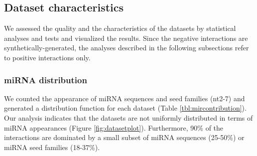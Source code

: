 \documentclass{bmcart}
\begin{document}
\begin{table}[h!]
\caption{Summary of data processing pipeline}
      \label{tal:pipeline_summary}
\end{table}

\subsection*{Dataset characteristics}
We assessed the quality and the characteristics of the datasets by statistical analyses and tests and visualized the results. Since the negative interactions are synthetically-generated, the analyses described in the following subsections refer to positive interactions only.

\subsubsection*{miRNA distribution}
We counted the appearance of miRNA sequences and seed families (nt2-7) and generated a distribution function for each dataset (Table \ref{tbl:mircontribution}). Our analysis indicates that the datasets are not uniformly distributed in terms of miRNA appearances (Figure \ref{fig:datasetplot}). Furthermore, 90\% of the interactions are dominated by a small subset of miRNA sequences (25-50\%) or miRNA seed families (18-37\%).
\end{document}
